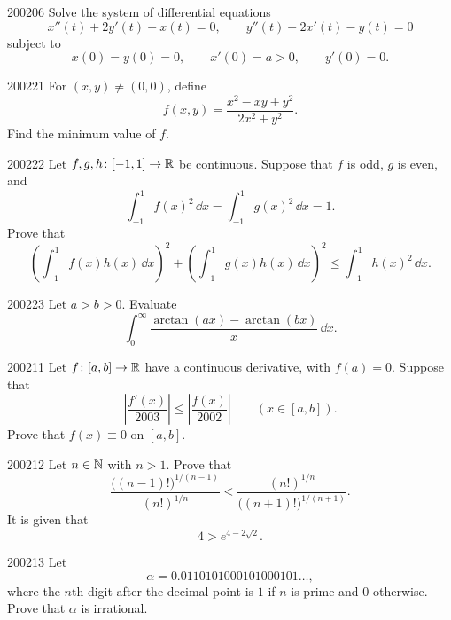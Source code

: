 \begin{problem}{2002}{0}{6}
Solve the system of differential equations
\[
    x''(t)+2y'(t)-x(t)=0,
    \qquad
    y''(t)-2x'(t)-y(t)=0
\]
subject to
\[
    x(0)=y(0)=0,
    \qquad
    x'(0)=a>0,
    \qquad
    y'(0)=0.
\]
\end{problem}

\begin{problem}{2002}{2}{1}
For $(x, y)\ne(0, 0)$, define
\[
    f(x, y)=\frac{x^2-xy+y^2}{2x^2+y^2}.
\]
Find the minimum value of $f$.
\end{problem}

\begin{problem}{2002}{2}{2}
Let $f, g, h\colon[-1, 1]\to\mathbb{R}$ be continuous. Suppose that $f$ is odd, $g$ is even, and
\[
    \int_{-1}^{1}f(x)^2\, \dd x
    =
    \int_{-1}^{1}g(x)^2\, \dd x
    =1.
\]
Prove that
\[
    \left(\int_{-1}^{1}f(x)h(x)\, \dd x\right)^2
    +
    \left(\int_{-1}^{1}g(x)h(x)\, \dd x\right)^2
    \le
    \int_{-1}^{1}h(x)^2\, \dd x.
\]
\end{problem}

\begin{problem}{2002}{2}{3}
Let $a>b>0$. Evaluate
\[
    \int_0^{\infty}
    \frac{\arctan(ax)-\arctan(bx)}{x}\, \dd x.
\]
\end{problem}

\begin{problem}{2002}{1}{1}
Let $f\colon[a, b]\to\mathbb{R}$ have a continuous derivative, with $f(a)=0$. Suppose that
\[
    \left|\frac{f'(x)}{2003}\right|
    \le
    \left|\frac{f(x)}{2002}\right|
    \qquad
    (x\in[a, b]).
\]
Prove that $f(x)\equiv0$ on $[a, b]$.
\end{problem}

\begin{problem}{2002}{1}{2}
Let $n\in\mathbb{N}$ with $n>1$. Prove that
\[
    \frac{\bigl((n-1)!\bigr)^{1/(n-1)}}{(n!)^{1/n}}
    <
    \frac{(n!)^{1/n}}{\bigl((n+1)!\bigr)^{1/(n+1)}}.
\]
It is given that
\[
    4>e^{4-2\sqrt2}.
\]
\end{problem}

\begin{problem}{2002}{1}{3}
Let
\[
    \alpha=0.0110101000101000101\dots,
\]
where the $n$th digit after the decimal point is $1$ if $n$ is prime and $0$ otherwise. Prove that $\alpha$ is irrational.
\end{problem}
